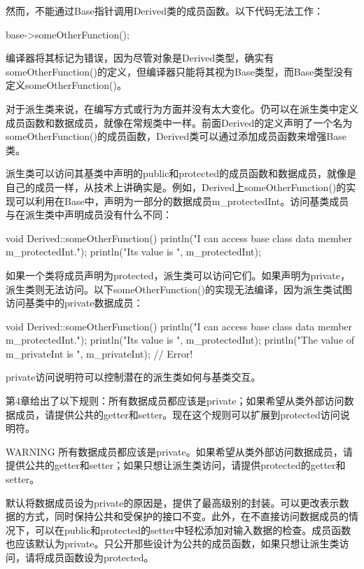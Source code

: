 然而，不能通过Base指针调用Derived类的成员函数。以下代码无法工作：

\begin{cpp}
base->someOtherFunction();
\end{cpp}

编译器将其标记为错误，因为尽管对象是Derived类型，确实有someOtherFunction()的定义，但编译器只能将其视为Base类型，而Base类型没有定义someOtherFunction()。


对于派生类来说，在编写方式或行为方面并没有太大变化。仍可以在派生类中定义成员函数和数据成员，就像在常规类中一样。前面Derived的定义声明了一个名为someOtherFunction()的成员函数，Derived类可以通过添加成员函数来增强Base类。

派生类可以访问其基类中声明的public和protected的成员函数和数据成员，就像是自己的成员一样，从技术上讲确实是。例如，Derived上someOtherFunction()的实现可以利用在Base中，声明为一部分的数据成员m\_protectedInt。访问基类成员与在派生类中声明成员没有什么不同：

\begin{cpp}
void Derived::someOtherFunction()
{
    println("I can access base class data member m_protectedInt.");
    println("Its value is {}", m_protectedInt);
}
\end{cpp}

如果一个类将成员声明为protected，派生类可以访问它们。如果声明为private，派生类则无法访问。以下someOtherFunction()的实现无法编译，因为派生类试图访问基类中的private数据成员：

\begin{cpp}
void Derived::someOtherFunction()
{
    println("I can access base class data member m_protectedInt.");
    println("Its value is {}", m_protectedInt);
    println("The value of m_privateInt is {}", m_privateInt); // Error!
}
\end{cpp}

private访问说明符可以控制潜在的派生类如何与基类交互。

第4章给出了以下规则：所有数据成员都应该是private；如果希望从类外部访问数据成员，请提供公共的getter和setter。现在这个规则可以扩展到protected访问说明符。

\begin{myWarning}{WARNING}
所有数据成员都应该是private。如果希望从类外部访问数据成员，请提供公共的getter和setter；如果只想让派生类访问，请提供protected的getter和setter。
\end{myWarning}

默认将数据成员设为private的原因是，提供了最高级别的封装。可以更改表示数据的方式，同时保持公共和受保护的接口不变。此外，在不直接访问数据成员的情况下，可以在public和protected的setter中轻松添加对输入数据的检查。成员函数也应该默认为private。只公开那些设计为公共的成员函数，如果只想让派生类访问，请将成员函数设为protected。

